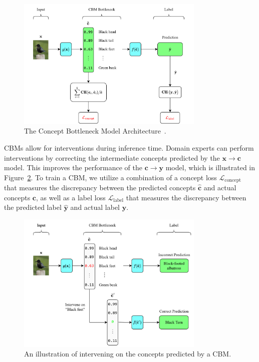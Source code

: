 \begin{figure}[!ht]
    \centering
    \includegraphics[width=0.8\textwidth]{figs/background/cbm.png}
    \caption{The Concept Bottleneck Model  Architecture~\cite{cbm}.}
    \label{fig:cbm}
\end{figure}

CBMs allow for interventions during 
inference time. Domain experts can 
perform interventions by correcting the intermediate concepts
predicted by the $\mathbf{x} \to \mathbf{c}$ model. This improves the performance of the $\mathbf{c} \to \mathbf{y}$ model,
which is illustrated in Figure~\ref{fig:cbm-interventions}.
To train a CBM, we utilize a combination of 
a concept loss $\mathcal{L}_{\text{concept}}$ that measures the
discrepancy between the predicted concepts $\hat{\mathbf{c}}$ 
and actual concepts $\mathbf{c}$, as well as a label loss $\mathcal{L}_{\text{label}}$
that measures the discrepancy between the predicted label $\hat{\mathbf{y}}$
and actual label $\mathbf{y}$.

\begin{figure}[!ht]
    \centering
    \includegraphics[width=0.8\textwidth]{figs/background/cbm_interventions.png}
    \caption{An illustration of intervening on the concepts predicted by a CBM.}
    \label{fig:cbm-interventions}
\end{figure}

